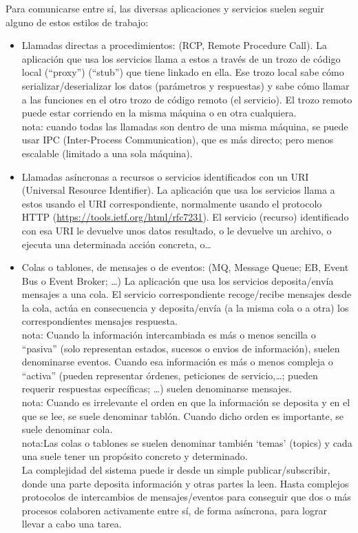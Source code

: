 \documentclass[spanish,12pt,a4paper,final,oneside]{book}
\begin{document}
Para comunicarse entre sí, las diversas aplicaciones y servicios suelen seguir alguno de estos estilos de trabajo:
\begin{itemize}
\item Llamadas directas a procedimientos: (RCP, Remote Procedure Call). 
La aplicación que usa los servicios llama a estos a través de un trozo de código local (“proxy”) (“stub”) que tiene linkado en ella. Ese trozo local sabe cómo serializar/deserializar los datos (parámetros y respuestas) y sabe cómo llamar a las funciones en el otro trozo de código remoto (el servicio). El trozo remoto puede estar corriendo en la misma máquina o en otra cualquiera.
\\nota: cuando todas las llamadas son dentro de una misma máquina, se puede usar IPC (Inter-Process Communication), que es más directo; pero menos escalable (limitado a una sola máquina).

\item Llamadas asíncronas a recursos o servicios identificados con un URI (Universal Resource Identifier). La aplicación que usa los servicios llama a estos usando el URI correspondiente, normalmente usando el protocolo HTTP (\url{https://tools.ietf.org/html/rfc7231}). El servicio (recurso) identificado con esa URI le devuelve unos datos resultado, o le devuelve un archivo, o ejecuta una determinada acción concreta, o\ldots

\item Colas o tablones, de mensajes o de eventos: (MQ, Message Queue; EB, Event Bus o Event Broker; \ldots) 
La aplicación que usa los servicios deposita/envía mensajes a una cola. El servicio correspondiente recoge/recibe mensajes desde la cola, actúa en consecuencia y deposita/envía  (a la misma cola o a otra)  los correspondientes mensajes respuesta.
\\nota: Cuando la información intercambiada es más o menos sencilla o ``pasiva'' (solo representan estados, sucesos o envios de información), suelen denominarse eventos. Cuando esa información es más o menos compleja o ``activa'' (pueden representar órdenes, peticiones de servicio,\ldots; pueden requerir respuestas específicas; \ldots) suelen denominarse mensajes.
\\nota: Cuando es irrelevante el orden en que la información se deposita y en el que se lee, se suele denominar tablón. Cuando dicho orden es importante, se suele denominar cola.
\\nota:Las colas o tablones se suelen denominar también `temas' (topics) y cada una suele tener un propósito concreto y determinado.
\\La complejidad del sistema puede ir desde un simple publicar/subscribir, donde una parte deposita información y otras partes la leen. Hasta complejos protocolos de intercambios de mensajes/eventos para conseguir que dos o más procesos colaboren activamente entre sí, de forma asíncrona, para lograr llevar a cabo una tarea.

\end{itemize}
\end{document}
